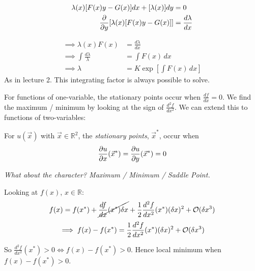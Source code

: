 \documentclass[twoside]{scrartcl}
\begin{document}
\[
\begin{aligned}
  \lambda(x)[F(x)y - G(x)]dx + [\lambda(x)]dy &=0\\
  \frac{\del}{\del y}[\lambda(x)[F(x)y-G(x)]] &= \frac{d\lambda}{dx}
\end{aligned}
\]

\[
\begin{aligned}
  \implies \lambda(x)F(x) &= \frac{d\lambda}{dx}\\
  \implies \int \frac{d\lambda}{\lambda} &= \int F(x)\,dx\\
  \implies \lambda &= K\exp[\int F(x)\,dx]
\end{aligned}
\]
As in lecture 2. This integrating factor is always possible to solve. 






\vspace*{5pt} %

For functions of one-variable, the stationary points occur when $\frac{df}{dx} = 0$. We find the maximum / minimum by looking at the sign of $\frac{d^2f}{dx^2}$. We can extend this to functions of two-variables:\\


\begin{definition}
For $u(\vec{x})$ with $\vec{x} \in \mathbb{R}^2$, the \emph{stationary points}, $\vec{x}^*$, occur when
\[\frac{\del u}{\del x}(\vec{x}^*) = \frac{\del u}{\del y}(\vec{x}^*) = 0\]
\end{definition}

\textit{What about the character? Maximum / Minimum / Saddle Point.}~\\

\begin{example}Looking at $f(x)$, $x \in \mathbb{R}$:
\[f(x) = f(x^*) + \cancel{\frac{df}{dx}(x^*)\delta x} + \frac{1}{2} \frac{d^2f}{dx^2}(x^*)(\delta x)^2 + \cal{O}(\delta x^3)\]
\[\implies f(x) - f(x^*) = \frac{1}{2} \frac{d^2f}{dx^2}(x^*)(\delta x)^2 + \cal{O}(\delta x^3)\]

So  $\frac{d^2f}{dx^2}(x^*) > 0 \iff f(x) - f(x^*) > 0$. Hence local minimum when $f(x) -f(x^*) > 0$.
\end{example}~
\end{document}
